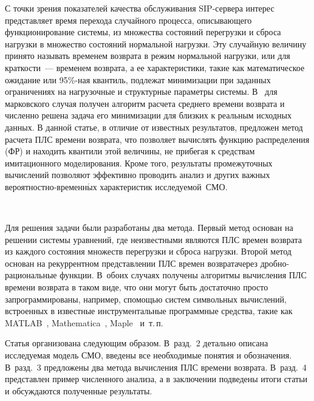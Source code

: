 \begin{multicols}{2}
С точки зрения показателей качества обслуживания SIP-сер\-ве\-ра интерес
представляет время перехода случайного процесса, описывающего
функционирование системы, из множества состояний перегрузки и сброса
нагрузки в множество состояний нормальной нагрузки. Эту случайную
величину принято называть временем возврата в режим нормальной
нагрузки, или для краткости~--- временем возврата, а ее
характеристики, такие как математическое ожидание или 95\%-ная
квантиль, подлежат минимизации при заданных ограничениях на
нагрузочные и структурные параметры системы. В~\cite{32-pe} для марковского
случая получен алгоритм расчета среднего времени возврата и численно
решена задача его минимизации для близких к реальным исходных
данных. В данной статье, в отличие от известных результатов,
предложен метод расчета ПЛС
времени возврата, что позволяет вычислять функцию распределения (ФР)
и находить квантили этой величины, не прибегая к средствам
имитационного моделирования. Кроме того, результаты промежуточных
вычислений позволяют эффективно проводить анализ и других важных
ве\-ро\-ят\-но\-ст\-но-вре\-мен\-н$\acute{\mbox{ы}}$х характеристик исследуемой~СМО.

\begin{figure*}[b] %
\vspace*{1pt}
\begin{center}
\mbox{%
 \epsfxsize=108.952mm
 }
  \end{center}
 \vspace*{-9pt}
\end{figure*}

Для решения задачи были разработаны два метода. Первый метод основан
на решении системы уравнений, где неизвестными являются ПЛС времен
возврата из каждого состояния множеств перегрузки и сброса нагрузки.
Второй метод основан на рекуррентном представлении ПЛС времен
возврата\linebreak через дроб\-но-ра\-ци\-о\-наль\-ные функции. В~обоих случаях получены
алгоритмы вычисления ПЛС времени возврата в таком виде, что они
могут быть достаточно просто запрограммированы, например, с\linebreak помощью
сис\-тем символьных вычислений, встроенных в известные
инструментальные про\-грам\-мные средства, такие как MATLAB~\cite{33-pe},
Mathematica~\cite{34-pe}, Maple~\cite{35-pe} и~т.\,п.

Статья организована следующим образом. В~разд.~2 детально описана
исследуемая модель СМО, введены все необходимые понятия и
обозначения. В~разд.~3 предложены два метода вы\-чис\-ле\-ния ПЛС
времени возврата. В~разд.~4 пред\-став\-лен пример чис\-лен\-но\-го анализа,
а в заключении подведены итоги статьи и обсуждаются полученные
резуль\-таты.


\end{multicols}
